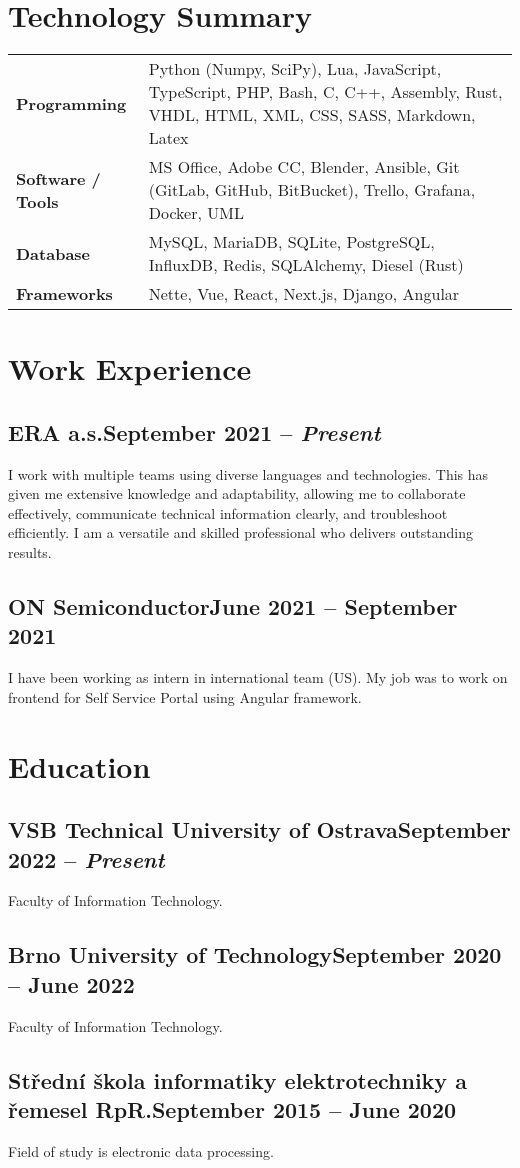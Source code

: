 \documentclass{article}
\newcommand{\dsubsection}[2]{
    \subsection{\textbf{\large{#1}}\hfill\textmd{\small{#2}}}
}
\begin{document}
\section{Technology Summary}

{\renewcommand{\arraystretch}{1.5}%
\begin{tabularx}{\textwidth}{ >{\bfseries}l X }
    Programming       & Python (Numpy, SciPy), Lua, JavaScript, TypeScript, PHP, Bash, C, C++, Assembly, Rust, VHDL, HTML, XML, CSS, SASS, Markdown, Latex \\
    Software / Tools  & MS Office, Adobe CC, Blender, Ansible, Git (GitLab, GitHub, BitBucket), Trello, Grafana, Docker, UML \\
    Database          & MySQL, MariaDB, SQLite, PostgreSQL, InfluxDB, Redis, SQLAlchemy, Diesel (Rust) \\
    Frameworks        & Nette, Vue, React, Next.js, Django, Angular \\
\end{tabularx}}


\section{Work Experience}

\dsubsection{ERA a.s.}{September 2021 -- \textit{Present}}

I work with multiple teams using diverse languages and technologies. This has given me extensive knowledge and adaptability,
allowing me to collaborate effectively, communicate technical information clearly, and troubleshoot efficiently. I am a versatile and skilled
professional who delivers outstanding results.

\dsubsection{ON Semiconductor}{June 2021 -- September 2021}

I have been working as intern in international team (US). My job was to work on frontend for Self Service Portal using Angular framework.


\section{Education}

\dsubsection{VSB Technical University of Ostrava}{September 2022 -- \textit{Present}}

Faculty of Information Technology.

\dsubsection{Brno University of Technology}{September 2020 -- {June 2022}}

Faculty of Information Technology.

\dsubsection{Střední škola informatiky elektrotechniky a řemesel RpR.}{September 2015 -- June 2020}

Field of study is electronic data processing.
\end{document}
